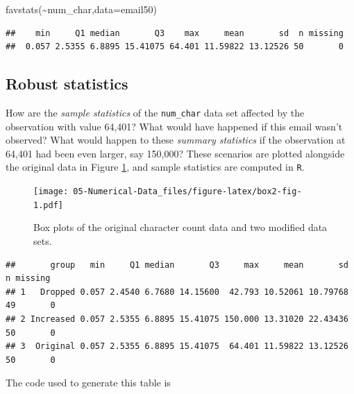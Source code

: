 \documentclass[
]{book}
\newenvironment{Shaded}{\begin{snugshade}}{\end{snugshade}}
\newcommand{\AttributeTok}[1]{\textcolor[rgb]{0.77,0.63,0.00}{#1}}
\newcommand{\FunctionTok}[1]{\textcolor[rgb]{0.00,0.00,0.00}{#1}}
\newcommand{\NormalTok}[1]{#1}
\newcommand{\SpecialCharTok}[1]{\textcolor[rgb]{0.00,0.00,0.00}{#1}}
\begin{document}
\begin{Shaded}
\begin{Highlighting}[]
\FunctionTok{favstats}\NormalTok{(}\SpecialCharTok{\textasciitilde{}}\NormalTok{num\_char,}\AttributeTok{data=}\NormalTok{email50)}
\end{Highlighting}
\end{Shaded}

\begin{verbatim}
##    min     Q1 median       Q3    max     mean       sd  n missing
##  0.057 2.5355 6.8895 15.41075 64.401 11.59822 13.12526 50       0
\end{verbatim}

\hypertarget{robust-statistics}{%
\subsection{Robust statistics}\label{robust-statistics}}

How are the \emph{sample statistics} of the \texttt{num\_char} data set affected by the observation with value 64,401? What would have happened if this email wasn't observed? What would happen to these \emph{summary statistics} if the observation at 64,401 had been even larger, say 150,000? These scenarios are plotted alongside the original data in Figure \ref{fig:box2-fig}, and sample statistics are computed in \texttt{R}.

\begin{figure}
\centering
\texttt{[image: 05-Numerical-Data\_files/figure-latex/box2-fig-1.pdf]}
\caption{\label{fig:box2-fig}Box plots of the original character count data and two modified data sets.}
\end{figure}

\begin{verbatim}
##       group   min     Q1 median       Q3     max     mean       sd  n missing
## 1   Dropped 0.057 2.4540 6.7680 14.15600  42.793 10.52061 10.79768 49       0
## 2 Increased 0.057 2.5355 6.8895 15.41075 150.000 13.31020 22.43436 50       0
## 3  Original 0.057 2.5355 6.8895 15.41075  64.401 11.59822 13.12526 50       0
\end{verbatim}

The code used to generate this table is
\end{document}

